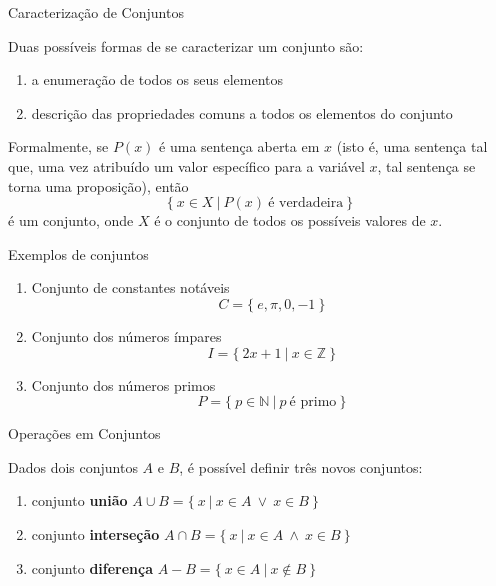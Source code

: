 \begin{frame}[fragile]{Caracterização de Conjuntos}

Duas possíveis formas de se caracterizar um conjunto são:

\begin{enumerate}
    \item a enumeração de todos os seus elementos
    \item descrição das propriedades comuns a todos os elementos do conjunto
\end{enumerate}


\vspace{0.2in}
Formalmente, se $P(x)$ é uma sentença aberta em $x$ (isto é, uma sentença tal que, uma vez atribuído um valor específico para a variável $x$, tal sentença se torna uma proposição), então
\[
    \{\ x\in X\ |\ P(x)\ \mbox{é verdadeira}\ \}
\]
é um conjunto, onde $X$ é o conjunto de  todos os possíveis valores de $x$.

\end{frame}

\begin{frame}[fragile]{Exemplos de conjuntos}

    \begin{enumerate}
        \item Conjunto de constantes notáveis
$$
    C = \{\ e, \pi, 0, -1\ \}
$$

        \item Conjunto dos números ímpares
$$
    I = \{\ 2x + 1 \ |\ x\in \mathbb{Z}\ \}
$$

        \item Conjunto dos números primos
$$
    P = \{\ p\in \mathbb{N}\ |\ p\ \mbox{é primo}\ \}
$$
    \end{enumerate}

\end{frame}

\begin{frame}[fragile]{Operações em Conjuntos}

Dados dois conjuntos $A$ e $B$, é possível definir três novos conjuntos:

    \begin{enumerate}
        \item conjunto \textbf{união} $A \cup B = \{\ x\ |\ x \in A\  \lor\  x\in B\ \}$
        \item conjunto \textbf{interseção} $A \cap B = \{\ x \ |\ x \in A\  \land\  x \in B\ \}$
        \item conjunto \textbf{diferença} $A - B = \{\ x \in A \ |\ x \not\in B\ \}$
    \end{enumerate}

\end{frame}

